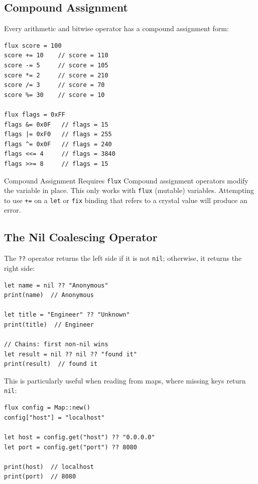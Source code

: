 \subsection{Compound Assignment}\label{subsec:compound-assignment}

Every arithmetic and bitwise operator has a compound assignment form:

\begin{lstlisting}[language=Lattice, caption={Compound assignment operators}]
flux score = 100
score += 10    // score = 110
score -= 5     // score = 105
score *= 2     // score = 210
score /= 3     // score = 70
score %= 30    // score = 10

flux flags = 0xFF
flags &= 0x0F   // flags = 15
flags |= 0xF0   // flags = 255
flags ^= 0x0F   // flags = 240
flags <<= 4     // flags = 3840
flags >>= 8     // flags = 15
\end{lstlisting}

\begin{notebox}{Compound Assignment Requires \texttt{flux}}
Compound assignment operators modify the variable in place.
This only works with \lstinline|flux| (mutable) variables.
Attempting to use \lstinline|+=| on a \lstinline|let| or \lstinline|fix| binding that refers to a crystal value will produce an error.
\end{notebox}

\subsection{The Nil Coalescing Operator}\label{subsec:nil-coalescing}

The \lstinline|??| operator returns the left side if it is not \lstinline|nil|; otherwise, it returns the right side:

\begin{lstlisting}[language=Lattice, caption={Nil coalescing}]
let name = nil ?? "Anonymous"
print(name)  // Anonymous

let title = "Engineer" ?? "Unknown"
print(title)  // Engineer

// Chains: first non-nil wins
let result = nil ?? nil ?? "found it"
print(result)  // found it
\end{lstlisting}

This is particularly useful when reading from maps, where missing keys return \lstinline|nil|:

\begin{lstlisting}[language=Lattice, caption={Nil coalescing with map lookups}]
flux config = Map::new()
config["host"] = "localhost"

let host = config.get("host") ?? "0.0.0.0"
let port = config.get("port") ?? 8080

print(host)  // localhost
print(port)  // 8080
\end{lstlisting}

